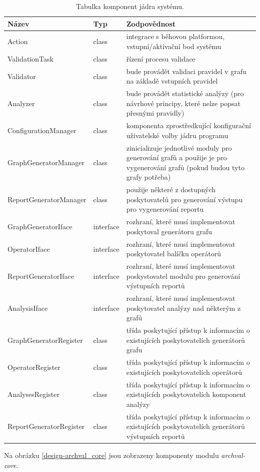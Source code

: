 \begin{table}
  \caption{Tabulka komponent jádra systému. \label{design-archval_core_components}}
  \begin{center}
    \begin{tabular}{| l | l | p{8cm} | }
      \hline
      \textbf{Název} & \textbf{Typ} & \textbf{Zodpovědnost} \\
      \hline
      \hline
      Action & class & integrace s běhovou platformou, vstupní/aktivační bod systému \\ \hline
      ValidationTask & class & řízení procesu validace \\ \hline
      Validator & class & bude provádět validaci pravidel v grafu na základě vstupních pravidel \\ \hline
      Analyzer & class & bude provádět statistické analýzy (pro návrhové principy, které nelze popsat přesnými pravidly) \\ \hline
      ConfigurationManager & class & komponenta zprostředkující konfigurační uživatelské volby jádru programu \\ \hline
      GraphGeneratorManager & class & zinicializuje jednotlivé moduly pro generování grafů a použije je pro vygenerování grafů (pokud budou tyto grafy potřeba) \\ \hline
      ReportGeneratorManager & class & použije některé z dostupných poskytovatelů pro generování výstupu pro vygenerování reportu \\ \hline
      GraphGeneratorIface & interface & rozhraní, které musí implementovat poskytoval generátoru grafu \\ \hline
      OperatorIface & interface & rozhraní, které musí implementovat poskytovatel balíčku operátorů \\ \hline
      ReportGeneratorIface & interface & rozhraní, které musí implementovat poskystovatel modulu pro generování výstupních reportů \\ \hline
      AnalysisIface & interface & rozhraní, které musí implementovat poskytovatel analýzy nad některým z grafů \\ \hline
      GraphGeneratorRegister & class & třída poskytující přístup k informacím o existujících poskytovatelích generátorů grafu \\ \hline
      OperatorRegister & class & třída poskytující přístup k informacím o existujících poskytovatelích operátorů \\ \hline
      AnalysesRegister & class & třída poskytující přístup k informacím o existujících poskytovatelích komponent analýzy \\ \hline
      ReportGeneratorRegister & class & třída poskytující přístup k informacím o existujících poskytovatelích generátorů výstupních reportů \\ \hline
    \end{tabular}
  \end{center}

\end{table}
Na obrázku \ref{design-archval_core} jsou zobrazeny komponenty modulu \emph{archval-core}.

